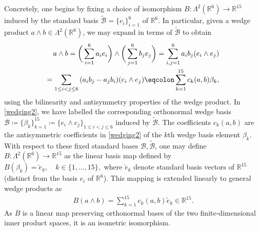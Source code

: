 \documentclass[sn-mathphys-num]{sn-jnl}%
\theoremstyle{thmstyleone}%
\theoremstyle{thmstyletwo}%
\theoremstyle{thmstylethree}%
\numberwithin{remark}{section}
\numberwithin{definition}{section}
\numberwithin{equation}{section}
\numberwithin{theorem}{section}
\newcommand{\R}{\ensuremath{\mathbb{R}}}%
\begin{document}
Concretely, one begins by fixing a choice of isomorphism $B\colon \Lambda^{2}(\R^{6}) \to \R^{15}$ induced by the standard basis $\tilde{\mathcal{B}}=\{e_{i}\}_{i=1}^{6}$ of $\R^{6}$. In particular, given a wedge product $ a \wedge b \in \Lambda^{2}(\R^{6})$, we may expand in terms of $\tilde{\mathcal{B}}$ to obtain
\begin{align}
   a\wedge b = \bigg(\sum_{i=1}^{6}{a_{i}e_{i}}\bigg)\wedge \bigg(\sum_{j=1}^{6}{b_{j}e_{j}}\bigg) = \sum_{i,j=1}^{6}{a_{i}b_{j} (e_{i}\wedge e_{j})}\notag\\ = \sum_{1\le i<j\le 6}{(a_{i}b_{j} - a_{j}b_{i}) (e_{i}\wedge e_{j})} \eqcolon \sum_{k=1}^{15}{c_{k}(a,b)\beta_{k}},\label{wedging2}
\end{align}
using the bilinearity and antisymmetry properties of the wedge product. In \cref{wedging2}, we have labelled the corresponding orthonormal wedge basis
$
    \mathcal{B} \coloneq \{\beta_{k}\}_{k=1}^{15} \coloneq \{e_{i}\wedge e_{j}\}_{1\le i<j\le 6}
$
induced by $\tilde{\mathcal{B}}$. The coefficients $c_{k}(a,b)$ are the antisymmetric coefficients in \cref{wedging2} of the $k$th wedge basis element $\beta_k$. With respect to these fixed standard bases $\mathcal{B},\tilde{\mathcal{B}}$, one may define $B\colon \Lambda^{2}(\R^{6}) \to \R^{15}$ as the linear basis map defined by 
$
  B(\beta_{k})=\tilde{e}_{k},\quad  k\in \{1,\dots,15\},   
$
where $\tilde e_{k}$ denote standard basis vectors of $\R^{15}$ (distinct from the basis $e_i$ of $\R^6$). This mapping is extended linearly to general wedge products as
\begin{align*}
   B(a\wedge b) = \sum_{k=1}^{15}{c_{k}(a,b)\tilde e_{k}}  \in\R^{15}.
\end{align*}
 As $B$ is a linear map preserving orthonormal bases of the two finite-dimensional inner product spaces, it is an isometric isomorphism. 

\end{document}

